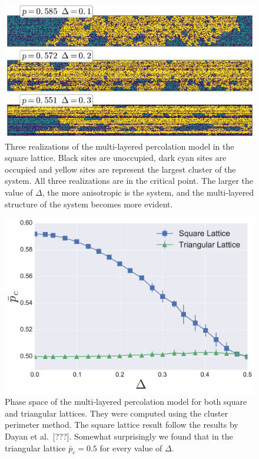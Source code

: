 \begin{figure}
\begin{center}
    \includegraphics[scale=0.6]{chapters/ch5-anis/figs/mlperco}
\end{center}
\caption{Three realizations of the multi-layered percolation model in the
    square lattice. Black sites are unoccupied, dark cyan sites are occupied
    and yellow sites are represent the largest cluster of the system. All
    three realizations are in the critical point. The larger the value of
    $\Delta$, the more anisotropic is the system, and the multi-layered
    structure of the system becomes more evident.}
\label{fig:mlperco}
\end{figure}

\begin{figure}
\begin{center}
    \includegraphics[scale=0.4]{chapters/ch5-anis/figs/mlp_ps}
\end{center}
\caption{Phase space of the multi-layered percolation model for both square and
    triangular lattices. They were computed using the cluster perimeter method.
    The square lattice result follow the results by Dayan et al.\ [???].
    Somewhat surprisingly we found that in the triangular lattice
    $\bar{p}_c=0.5$ for every value of $\Delta$.}
\label{fig:mlp_ps}
\end{figure}
